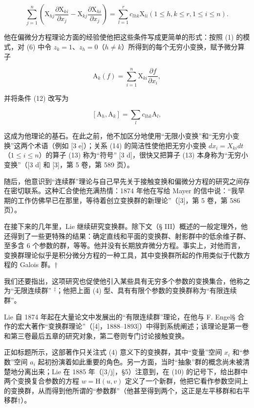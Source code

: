 \[
\sum_ {j = 1} ^ {n} \left(\mathrm{X} _ {h j} \frac {\partial \mathrm{X} _ {k i}}{\partial x _ {j}} - \mathrm{X} _ {k j} \frac {\partial \mathrm{X} _ {h i}}{\partial x _ {j}}\right) = \sum_ {l = 1} ^ {r} c _ {l h k} \mathrm{X} _ {l i} (1 \leqslant h, k \leqslant r, 1 \leqslant i \leqslant n). \tag{12}
\]

他在偏微分方程理论方面的经验使他把这些条件写成更简单的形式：按照 (1) 的模式，对 (6) 中令 \(z_{k} = 1\)、\(z_{h} = 0\)（\(h \neq k\)）所得到的每个无穷小变换，赋予微分算子

\[
\mathrm{A} _ {k} (f) = \sum_ {i = 1} ^ {n} \mathrm{X} _ {k i} \frac {\partial f}{\partial x _ {i}},\tag{13}
\]

并将条件 (12) 改写为

\[
[ \mathrm{A} _ {h}, \mathrm{A} _ {k} ] = \sum_ {l} c _ {l h k} \mathrm{A} _ {l},\tag{14}
\]

这成为他理论的基石。在此之前，他不加区分地使用“无限小变换”和“无穷小变换”这两个术语（例如 {[}3 e{]}）；关系 (14) 的简洁性使他把无穷小变换 \(dx_{i} = X_{ki}dt\)（\(1 \leqslant i \leqslant n\)）的算子 (13) 称为“符号” {[}3 d{]}，很快又把算子 (13) 本身称为“无穷小变换”（{[}3 d{]} 和 {[}3{]}，第 5 卷，第 589 页）。

随后，他意识到“连续群”理论与自己早先关于接触变换和偏微分方程的研究之间存在密切联系。这种汇合使他充满热情：1874 年他在写给 Mayer 的信中说：“我早期的工作仿佛早已在那里，等待着创立变换群的新理论”（{[}3{]}，第 5 卷，第 586 页）。

在接下来的几年里，Lie 继续研究变换群。除下文（§ III）概述的一般定理外，他还得到了一些更特殊的结果：确定直线和平面的变换群、射影群中的低余维子群、至多含 6 个参数的群，等等。他并没有长期放弃微分方程。事实上，对他而言，变换群理论似乎是积分微分方程的一种工具，其中变换群所起的作用类似于代数方程的 Galois 群。†

我们还要指出，这项研究也促使他引入某些具有无穷多个参数的变换集合，他称之为“无限连续群” \(^{‡}\)；他把上面 (4) 型、具有有限个参数的变换群称为“有限连续群”。


Lie 自 1874 年起在大量论文中发展出的“有限连续群”理论，在他与 F. Engel§ 合作的宏大著作“变换群理论”（{[}4{]}，1888--1893{]}）中得到系统阐述；该理论是第一卷和第三卷最后五章的研究对象，第二卷则专门讨论接触变换。

正如标题所示，这部著作只关注式 (4) 意义下的变换群，其中“变量”空间 \(x_{i}\) 和“参数”空间 \(a_{i}\) 起初扮演着如此重要的角色。另一方面，当时“抽象”群的概念尚未被清楚地分离出来；Lie 在 1885 年（{[}3/j{]}，§5）注意到，在 (10) 的记号下，给出群中两个变换复合参数的方程 \(w = \mathrm{H}(u, v)\) 定义了一个新群，他把它看作参数空间上的变换群，从而得到他所谓的“参数群”（他甚至得到两个，这正是左平移群和右平移群†）。

